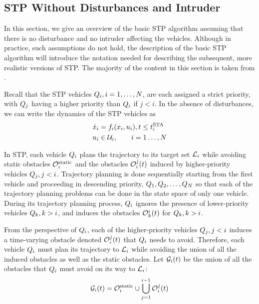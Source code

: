 \subsection{STP Without Disturbances and Intruder\label{sec:basic}}
In this section, we give an overview of the basic STP algorithm assuming that there is no disturbance and no intruder affecting the vehicles. Although in practice, such assumptions do not hold, the description of the basic STP algorithm will introduce the notation needed for describing the subsequent, more realistic versions of STP. The majority of the content in this section is taken from \cite{Chen15c}.

Recall that the STP vehicles $Q_i, i=1,\ldots,N$, are each assigned a strict priority, with $Q_j$ having a higher priority than $Q_i$ if $j<i$. In the absence of disturbances, we can write the dynamics of the STP vehicles as
\begin{equation}
\label{eq:dyn_no_dstb}
\begin{aligned}
\dot\state_i &= \fdyn_i(\state_i, \ctrl_i), t \le \sta_i \\
\ctrl_i &\in \cset_i, \qquad i = 1 \ldots, \N
\end{aligned}
\end{equation}

In STP, each vehicle $Q_i$ plans the trajectory to its target set $\mathcal{L}_i$ while avoiding static obstacles $\mathcal{O}^\text{static}_i$ and the obstacles $\mathcal{O}_i^j(t)$ induced by higher-priority vehicles $Q_j, j<i$. Trajectory planning is done sequentially starting from the first vehicle and proceeding in descending priority, $Q_1, Q_2, \ldots, Q_{N}$ so that each of the trajectory planning problems can be done in the state space of only one vehicle. During its trajectory planning process, $Q_i$ ignores the presence of lower-priority vehicles $Q_k, k>i$, and induces the obstacles $\mathcal{O}_k^i(t)$ for $Q_k, k>i$.

From the perspective of $Q_i$, each of the higher-priority vehicles $Q_j, j<i$ induces a time-varying obstacle denoted $\mathcal{O}_i^j(t)$ that $Q_i$ needs to avoid. Therefore, each vehicle $Q_i$ must plan its trajectory to $\mathcal{L}_i$ while avoiding the union of all the induced obstacles as well as the static obstacles. Let $\mathcal{G}_i(t)$ be the union of all the obstacles that $Q_i$ must avoid on its way to $\mathcal{L}_i$:
\begin{equation}
\label{eq:obsseti}
\obsset_i(t)  = \soset_i \cup \bigcup_{j=1}^{i-1} \ioset_i^j(t)
\end{equation}

